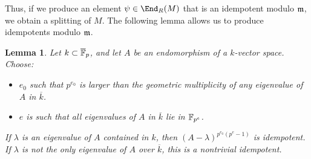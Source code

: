 \documentclass[12pt]{article}
\let\bar\overline
\theoremstyle{theorem}
\numberwithin{thm}{section}
\newtheorem{lem}[thm]{Lemma}
\theoremstyle{definition}
\begin{document}
Thus, if we produce an element $\psi \in \End_R(M)$ that is an idempotent modulo $\mathfrak m$, we obtain a splitting of $M$.
The following lemma allows us to produce idempotents modulo $\mathfrak m$.
\vadjust{\goodbreak}

\begin{lem}\label{lem:jordan}
  Let $k\subset \bar \F_{p}$, and let $A$ be an endomorphism of a $k$-vector space. 
Choose:
\begin{itemize}
\item $e_0$ such that $p^{e_0}$ is larger than the geometric multiplicity of any eigenvalue of $A$ in $\bar k$.
\item $e$ is such that all eigenvalues of $A$ in $\bar k$ lie in $\mathbb F_{p^e}$.
\end{itemize}
If $\lambda$ is an eigenvalue of $A$ contained in $k$, then $(A-\lambda)^{p^{e_0} (p^{e}-1)}$ is idempotent.
  If $\lambda$ is not the only eigenvalue of $A$ over $\bar k$, this is a nontrivial idempotent.
\end{lem}
\end{document}
